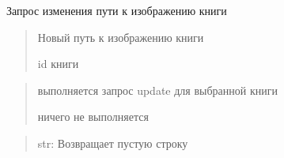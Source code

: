 \documentclass[letterpaper,10pt,russian]{sphinxmanual}
\begin{document}
\begin{fulllineitems}
\label{\detokenize{blueprints:blueprints.change_book_information.change_path_image}}
\pysigstartsignatures
{}
\pysigstopsignatures
\sphinxAtStartPar
Запрос изменения пути к изображению книги
\begin{description}
\begin{quote}\begin{description}
\sphinxAtStartPar
Новый путь к изображению книги

\sphinxAtStartPar
id книги

\end{description}\end{quote}

\begin{quote}\begin{description}
\sphinxAtStartPar
выполняется запрос update для выбранной книги

\sphinxAtStartPar
ничего не выполняется

\end{description}\end{quote}

\end{description}
\begin{quote}\begin{description}
\sphinxAtStartPar
str: Возвращает пустую строку

\end{description}\end{quote}

\end{fulllineitems}

\end{document}

